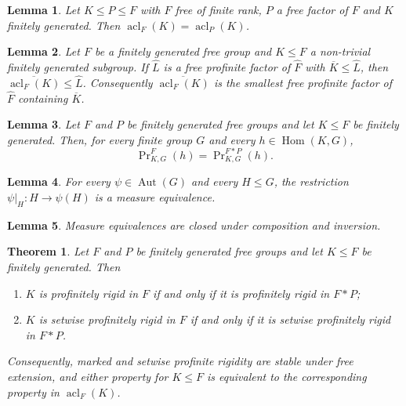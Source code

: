 \documentclass[10pt,a4paper]{amsart}
\newtheorem{theorem}{Theorem}
\newtheorem{lemma}{Lemma}
\newcommand{\Aut}{\operatorname{Aut}}
\newcommand{\Fhat}{\widehat{F}}
\newcommand{\Hom}{\operatorname{Hom}}
\newcommand{\acl}{\operatorname{acl}}
\begin{document}
\begin{lemma}\label{lem:acl-trans}
Let $K\le P\le F$ with $F$ free of finite rank, $P$ a free factor of $F$ and $K$
finitely generated. Then $\acl_F(K)=\acl_P(K)$.
\end{lemma}

\begin{lemma}\label{lem:smallest-factor}
Let $F$ be a finitely generated free group and $K\le F$ a non-trivial finitely
generated subgroup. If $\widehat L$ is a free profinite factor of $\Fhat$ with
$\overline K\le\widehat L$, then $\overline{\acl_F(K)}\le\widehat L$.
Consequently $\overline{\acl_F(K)}$ is the smallest free profinite factor of
$\Fhat$ containing $\overline K$.
\end{lemma}

\begin{lemma}\label{lem:measure-stable}
Let $F$ and $P$ be finitely generated free groups and let $K\le F$ be finitely
generated. Then, for every finite group $G$ and every $h\in\Hom(K,G)$,
\[
  \Pr\nolimits^{F}_{K,G}(h)=\Pr\nolimits^{F*P}_{K,G}(h).
\]
\end{lemma}

\begin{lemma}\label{lem:aut}
For every $\psi\in\Aut(G)$ and every $H\le G$, the restriction
$\psi|_H\colon H\to\psi(H)$ is a measure equivalence.
\end{lemma}

\begin{lemma}\label{lem:groupoid}
Measure equivalences are closed under composition and inversion.
\end{lemma}

\begin{theorem}\label{thm:universal}
Let $F$ and $P$ be finitely generated free groups and let $K\le F$ be finitely
generated. Then
\begin{enumerate}
\item[(i)] $K$ is profinitely rigid in $F$ if and only if it is profinitely
  rigid in $F*P$;
\item[(ii)] $K$ is setwise profinitely rigid in $F$ if and only if it is setwise
  profinitely rigid in $F*P$.
\end{enumerate}
Consequently, marked and setwise profinite rigidity are stable under free
extension, and either property for $K\le F$ is equivalent to the corresponding
property in $\acl_F(K)$.
\end{theorem}
\end{document}
